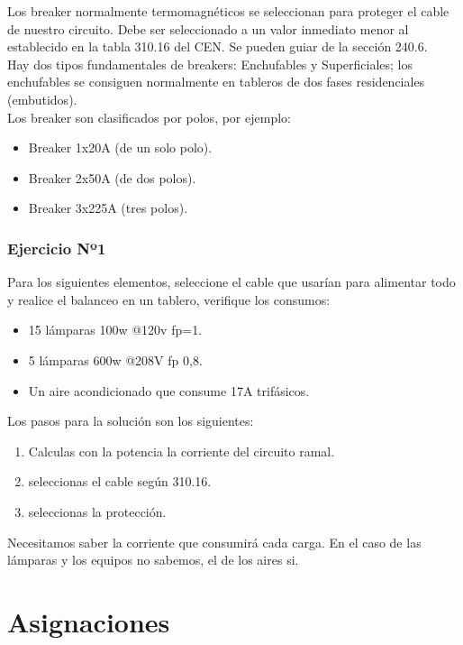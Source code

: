 \documentclass[11pt,letterpaper]{article}
\begin{document}
Los breaker normalmente termomagnéticos se seleccionan para proteger el cable de nuestro circuito. Debe ser seleccionado a un valor inmediato menor al establecido en la tabla 310.16 del CEN. Se pueden guiar de la sección 240.6.\\

Hay dos tipos fundamentales de breakers: Enchufables y Superficiales; los enchufables se consiguen normalmente en tableros de dos fases residenciales (embutidos).\\

Los breaker son clasificados por polos, por ejemplo:

\begin{itemize}
	\item Breaker 1x20A (de un solo polo).
	\item Breaker 2x50A (de dos polos).
	\item Breaker 3x225A (tres polos).
\end{itemize}

\subsubsection{Ejercicio Nº1}

Para los siguientes elementos, seleccione el cable que usarían para alimentar todo y realice el balanceo en un tablero, verifique los consumos:

\begin{itemize}
	\item 15 lámparas 100w @120v fp=1.
	\item 5 lámparas 600w @208V fp 0,8.
	\item Un aire acondicionado que consume 17A trifásicos.
\end{itemize}
Los pasos para la solución son los siguientes:
\begin{enumerate}
	\item Calculas con la potencia la corriente del circuito ramal.

	\item seleccionas el cable según 310.16.

	\item seleccionas la protección.
\end{enumerate}

Necesitamos saber la corriente que consumirá cada carga. En el caso de las lámparas y los equipos no sabemos, el de los aires si.

	
\section{Asignaciones}
\end{document}
